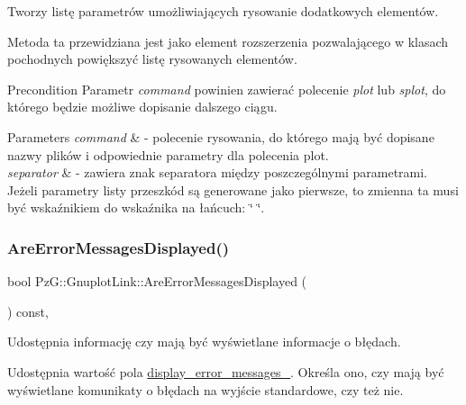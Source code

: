 Tworzy listę parametrów umożliwiających rysowanie dodatkowych elementów. 

Metoda ta przewidziana jest jako element rozszerzenia pozwalającego w klasach pochodnych powiększyć listę rysowanych elementów. \begin{DoxyPrecond}{Precondition}
Parametr {\itshape command} powinien zawierać polecenie {\itshape plot} lub {\itshape splot}, do którego będzie możliwe dopisanie dalszego ciągu. 
\end{DoxyPrecond}

\begin{DoxyParams}{Parameters}
{\em command} & -\/ polecenie rysowania, do którego mają być dopisane nazwy plików i odpowiednie parametry dla polecenia plot. \\
\hline
{\em separator} & -\/ zawiera znak separatora między poszczególnymi parametrami. Jeżeli parametry listy przeszkód są generowane jako pierwsze, to zmienna ta musi być wskaźnikiem do wskaźnika na łańcuch\+: \char`\"{} \char`\"{}. \\
\hline
\end{DoxyParams}
\mbox{\label{class_pz_g_1_1_gnuplot_link_a7d5d83803ea886a7b056e1d7a473bb3a}} 
\subsubsection{\texorpdfstring{Are\+Error\+Messages\+Displayed()}{AreErrorMessagesDisplayed()}}
{\footnotesize\ttfamily bool Pz\+G\+::\+Gnuplot\+Link\+::\+Are\+Error\+Messages\+Displayed (\begin{DoxyParamCaption}{ }\end{DoxyParamCaption}) const\hspace{0.3cm}{\ttfamily [inline]}, {\ttfamily [protected]}}



Udostępnia informację czy mają być wyświetlane informacje o błędach. 

Udostępnia wartość pola \hyperlink{class_pz_g_1_1_gnuplot_link_adefdb7c360e54c586b1d6bd1fa5c6eee}{display\+\_\+error\+\_\+messages\+\_\+}. Określa ono, czy mają być wyświetlane komunikaty o błędach na wyjście standardowe, czy też nie. \mbox{\label{class_pz_g_1_1_gnuplot_link_a562fc970535935237a32f18faf4f0b19}} 
